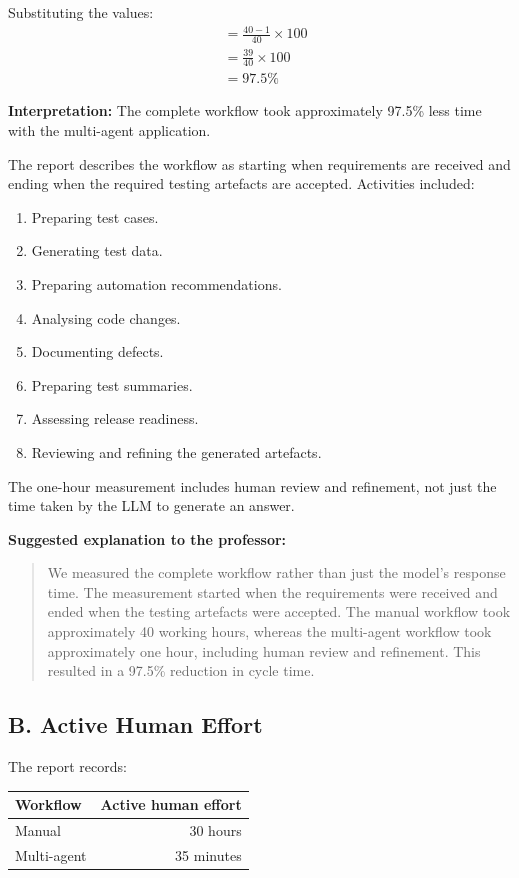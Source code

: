 \documentclass[11pt,a4paper]{article}
\begin{document}
Substituting the values:
\[
\begin{aligned}
&= \frac{40-1}{40}\times 100\\
&= \frac{39}{40}\times 100\\
&= \boxed{97.5\%}
\end{aligned}
\]

\textbf{Interpretation:} The complete workflow took approximately 97.5\% less time with the multi-agent application.

The report describes the workflow as starting when requirements are received and ending when the required testing artefacts are accepted. Activities included:
\begin{enumerate}
  \item Preparing test cases.
  \item Generating test data.
  \item Preparing automation recommendations.
  \item Analysing code changes.
  \item Documenting defects.
  \item Preparing test summaries.
  \item Assessing release readiness.
  \item Reviewing and refining the generated artefacts.
\end{enumerate}

The one-hour measurement includes human review and refinement, not just the time taken by the LLM to generate an answer.

\textbf{Suggested explanation to the professor:}

\begin{quote}
We measured the complete workflow rather than just the model's response time. The measurement started when the requirements were received and ended when the testing artefacts were accepted. The manual workflow took approximately 40 working hours, whereas the multi-agent workflow took approximately one hour, including human review and refinement. This resulted in a 97.5\% reduction in cycle time.
\end{quote}

\subsection{B. Active Human Effort}

The report records:

\begin{center}
\begin{tabular}{lr}
\toprule
\textbf{Workflow} & \textbf{Active human effort}\\
\midrule
Manual & 30 hours\\
Multi-agent & 35 minutes\\
\bottomrule
\end{tabular}
\end{center}
\end{document}
